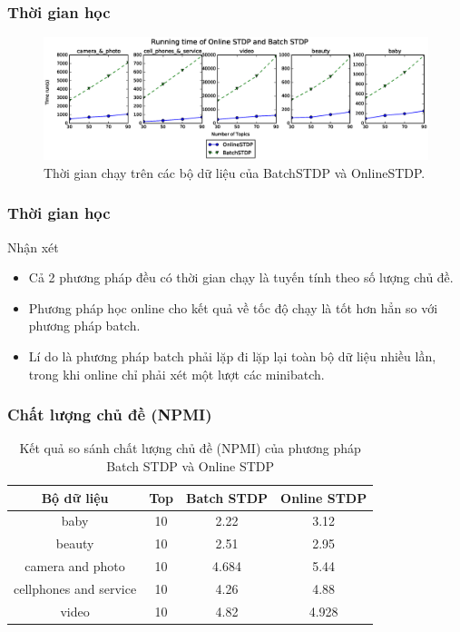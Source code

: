 \documentclass{beamer}
\begin{document}
\begin{frame}
\frametitle{Thời gian học}
\begin{center}
\begin{figure}
\includegraphics[scale=0.35]{Image/timerun/time_run_vn.eps}
\caption*{Thời gian chạy trên các bộ dữ liệu của BatchSTDP và OnlineSTDP.}
\end{figure}
\end{center}
\end{frame}

\begin{frame}
\frametitle{Thời gian học}
\begin{block}{Nhận xét}
\begin{itemize}
\item Cả 2 phương pháp đều có thời gian chạy là tuyến tính theo số lượng chủ đề.
\item Phương pháp học online cho kết quả về tốc độ chạy là tốt hơn hẳn so với phương pháp batch. 
\item Lí do là phương pháp batch phải lặp đi lặp lại toàn bộ dữ liệu nhiều lần, trong khi online chỉ phải xét một lượt các minibatch.
\end{itemize}
\end{block}
\end{frame}

\begin{frame}[shrink=30]
\frametitle{Chất lượng chủ đề (NPMI)}
\begin{table}[htp!]
\centering 
\caption*{Kết quả so sánh chất lượng chủ đề (NPMI) của phương pháp Batch STDP và Online STDP}
\label{tab:NPMI}
\begin{tabular}{|c|c|c|c|}
\hline
 Bộ dữ liệu & Top & Batch STDP & Online STDP \\ \hline
baby & 10 & 2.22 & 3.12\\ \hline 
beauty & 10 & 2.51 & 2.95\\ \hline
camera and photo & 10 & 4.684 & 5.44\\ \hline 
cellphones and service & 10 & 4.26 & 4.88\\ \hline
video & 10 & 4.82 & 4.928\\ \hline
\end{tabular}
\end{table}
\end{frame}
\end{document}
